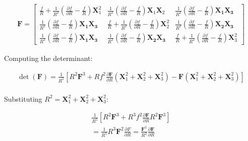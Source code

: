 \begin{problem}
\begin{enumerate}
\begin{enumerate}
        \begin{align}
        \mathbf{F}=\begin{bmatrix}
        \frac{f}{R}+\frac{1}{R^2}\left( \frac{ \partial f }{ \partial R } -\frac{f}{R} \right)\mathbf{X}_{1}^2 & \frac{1}{R^2}\left( \frac{ \partial f }{ \partial R } -\frac{f}{R} \right)\mathbf{X}_{1}\mathbf{X}_{2} & \frac{1}{R^2}\left( \frac{ \partial f }{ \partial R } -\frac{f}{R} \right)\mathbf{X_{1}\mathbf{X}_{3}} \\
        \frac{1}{R^2}\left( \frac{ \partial f }{ \partial R } -\frac{f}{R} \right)\mathbf{X_{1}\mathbf{X}_{3}}  &  \frac{f}{R}+\frac{1}{R^2}\left( \frac{ \partial f }{ \partial R } -\frac{f}{R} \right)\mathbf{X}_{2}^2 & \frac{1}{R^2}\left( \frac{ \partial f }{ \partial R } -\frac{f}{R} \right)\mathbf{X_{2}\mathbf{X}_{3}} \\
        \frac{1}{R^2}\left( \frac{ \partial f }{ \partial R } -\frac{f}{R} \right)\mathbf{X_{1}\mathbf{X}_{3}} & \frac{1}{R^2}\left( \frac{ \partial f }{ \partial R } -\frac{f}{R} \right)\mathbf{X_{2}\mathbf{X}_{3}} & \frac{f}{R}+\frac{1}{R^2}\left( \frac{ \partial f }{ \partial R } -\frac{f}{R} \right)\mathbf{\mathbf{X}}_{3}^2
        \end{bmatrix}
        \end{align}
    
        
        Computing the determinant:
        
    
        \begin{align}
        \det(\mathbf{F})=\frac{1}{R^5}\left[ R^2\mathbf{F}^3+Rf^2\frac{ \partial \mathbf{F} }{ \partial R } (\mathbf{X}_{1}^2+\mathbf{X}_{2}^2+\mathbf{X}_{3}^2)-\mathbf{F}(\mathbf{X}_{1}^2+\mathbf{X}_{2}^2+\mathbf{X}_{3}^2) \right] \\
        \end{align}
        
        
        Substituting $R^2=\mathbf{X}_{1}^2+\mathbf{X}_{2}^2+\mathbf{X}_{3}^2$:
        
        
        \begin{align}
        \frac{1}{R^5}\left[ R^2\mathbf{F}^3+R^3f^2\frac{ \partial \mathbf{F} }{ \partial R } R^2\mathbf{F}^3 \right] \\
        =\frac{1}{R^5}R^3\mathbf{F}^2\frac{ \partial F }{ \partial R } =\frac{\mathbf{F}^2}{R^2}\frac{ \partial \mathbf{F} }{ \partial R }  \\
        \end{align}
    

\end{enumerate}
\end{enumerate}
\end{problem}
